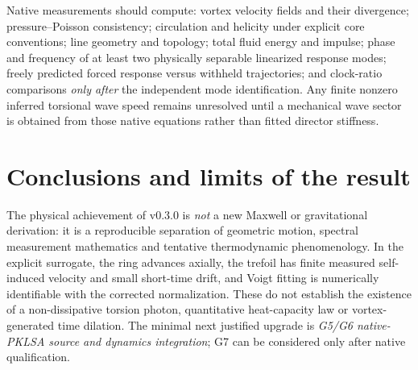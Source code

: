 \documentclass[11pt,a4paper]{article}
\begin{document}
Native measurements should compute: vortex velocity fields and their divergence; pressure--Poisson consistency; circulation and helicity under explicit core conventions; line geometry and topology; total fluid energy and impulse; phase and frequency of at least two physically separable linearized response modes; freely predicted forced response versus withheld trajectories; and clock-ratio comparisons \emph{only after} the independent mode identification. Any finite nonzero inferred torsional wave speed remains unresolved until a mechanical wave sector is obtained from those native equations rather than fitted director stiffness.

\section{Conclusions and limits of the result}
The physical achievement of v0.3.0 is \emph{not} a new Maxwell or gravitational derivation: it is a reproducible separation of geometric motion, spectral measurement mathematics and tentative thermodynamic phenomenology. In the explicit surrogate, the ring advances axially, the trefoil has finite measured self-induced velocity and small short-time drift, and Voigt fitting is numerically identifiable with the corrected normalization. These do not establish the existence of a non-dissipative torsion photon, quantitative heat-capacity law or vortex-generated time dilation. The minimal next justified upgrade is \emph{G5/G6 native-PKLSA source and dynamics integration}; G7 can be considered only after native qualification.
\end{document}
